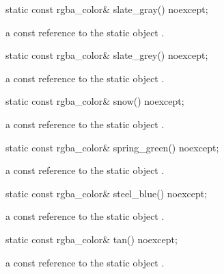 \begin{itemdecl}
static const rgba_color& slate_gray() noexcept;
\end{itemdecl}
\begin{itemdescr}
\pnum
\returns
a const reference to the static  object .
\end{itemdescr}

\begin{itemdecl}
static const rgba_color& slate_grey() noexcept;
\end{itemdecl}
\begin{itemdescr}
\pnum
\returns
a const reference to the static  object .
\end{itemdescr}

\begin{itemdecl}
static const rgba_color& snow() noexcept;
\end{itemdecl}
\begin{itemdescr}
\pnum
\returns
a const reference to the static  object .
\end{itemdescr}

\begin{itemdecl}
static const rgba_color& spring_green() noexcept;
\end{itemdecl}
\begin{itemdescr}
\pnum
\returns
a const reference to the static  object .
\end{itemdescr}

\begin{itemdecl}
static const rgba_color& steel_blue() noexcept;
\end{itemdecl}
\begin{itemdescr}
\pnum
\returns
a const reference to the static  object .
\end{itemdescr}

\begin{itemdecl}
static const rgba_color& tan() noexcept;
\end{itemdecl}
\begin{itemdescr}
\pnum
\returns
a const reference to the static  object .
\end{itemdescr}

